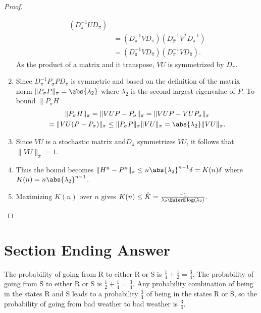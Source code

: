 \documentclass[12pt]{article}
\begin{document}
\begin{proof}
\begin{enumerate}
\begin{align*}
                (D_{\hat{\pi}}^{-1} U D_{\pi}) \\
                &= (D_{\pi}^{-1} V D_{\hat{\pi}})(D_{\hat{\pi}}^{-1} V^T
                D_{\pi}^{-1}) \\
                &= (D_{\pi}^{-1} V D_{\hat{\pi}})(D_{\pi}^{-1} V D_{\hat
                {\pi}}).
            \end{align*}
            As the product of a matrix and it transpose, \( VU \) is
            symmetrized by \( D_{\pi} \).
        \item
            Since \( D_{\pi}^{-1} P_{\sigma} P D_{\pi} \) is symmetric
            and based on the definition of the matrix norm \( \| P_{\sigma}
            P \|_{\pi} = \abs{\lambda_2} \) where \( \lambda_2 \) is the
            second-largest eigenvalue of \( P \).  To bound \( \| P_{\sigma}
            H \)
            \begin{multline*}
                \| P_{\sigma} H \|_{\pi} = \| VUP - P_{\sigma} \|_{\pi}
                = \| VUP - VUP_{\sigma}\|_{\pi} \\
                = \| VU(P - P_{\sigma})\|_{\pi} \le \|P_{\sigma} P\|_{\pi}
                \|VU\|_{\pi} = \abs{\lambda_2} \|VU\|_{\pi}.
            \end{multline*}
        \item
            Since \( VU \) is a stochastic matrix and\( D_{\pi} \)
            symmetrizes \( VU \), it follows that \( \| VU \|_{\pi} = 1 \).
        \item
            Thus the bound becomes \( \| H^n - P^n\|_{\pi} \le n \abs{\lambda_2}^
            {n-1} \delta = K(n) \delta \) where \( K(n) = n \abs{\lambda_2}^
            {n-1} \).
        \item
            Maximizing \( K(n) \) over \( n \) gives \( K(n) \le \hat{K}
            = \frac{-1}{\lambda_2 \EulerE \log(\lambda_2)} \).
    \end{enumerate}
\end{proof}

\section*{Section Ending Answer}

The probability of going from R to either R or S is \( \frac{1}{4} +
\frac{1}{2} = \frac{3}{4}\).  
The probability of going from S to either R or S is \( \frac{1}{2} +
\frac{1}{4} = \frac{3}{4}\).  Any probability combination of being in
the states R and S leads to a probability \( \frac{3}{4} \) of being
in the states R or S, so the probability of going from bad weather to
bad weather is \( \frac{3}{4} \).
\end{document}
